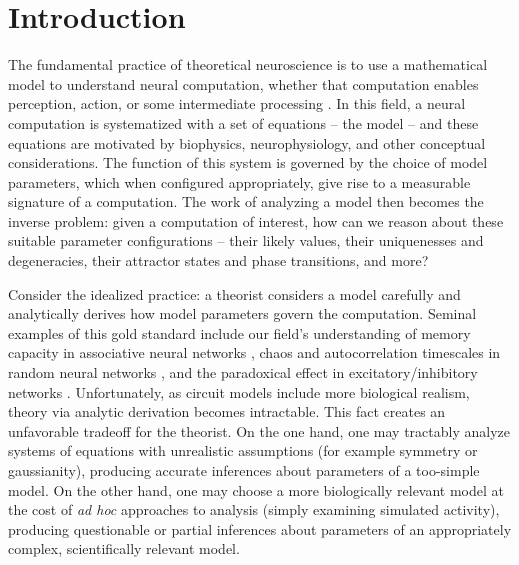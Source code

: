 \documentclass[11pt]{article}
\begin{document}
\section{Introduction}
The fundamental practice of theoretical neuroscience is to use a mathematical model to understand neural computation, whether that computation enables perception, action, or some intermediate processing \cite{abbott2008theoretical}.  
In this field, a neural computation is systematized with a set of equations -- the model -- and these equations are motivated by biophysics, neurophysiology, and other conceptual considerations.
The function of this system is governed by the choice of model parameters, which when configured appropriately, give rise to a measurable signature of a computation.   
The work of analyzing a model then becomes the inverse problem: given a computation of interest, how can we reason about these suitable parameter configurations -- their likely values, their uniquenesses and degeneracies, their attractor states and phase transitions, and more?  

Consider the idealized practice: a theorist considers a model carefully and analytically derives how model parameters govern the computation.  
Seminal examples of this gold standard include our field's understanding of memory capacity in associative neural networks \cite{hopfield1984neurons}, chaos and autocorrelation timescales in random neural networks \cite{sompolinsky1988chaos}, and the paradoxical effect in excitatory/inhibitory networks \cite{tsodyks1997paradoxical}.  
Unfortunately, as circuit models include more biological realism, theory via analytic derivation becomes intractable.  
This fact creates an unfavorable tradeoff for the theorist.  On the one hand, one may tractably analyze systems of equations with unrealistic assumptions (for example symmetry or gaussianity), producing accurate inferences about parameters of a too-simple model.  On the other hand, one may choose a more biologically relevant model at the cost of \emph{ad hoc} approaches to analysis (simply examining simulated activity), producing questionable or partial inferences about parameters of an appropriately complex, scientifically relevant model.  %
\end{document}
